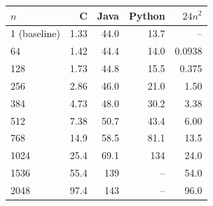 \begin{tabular}{lrrrr}
\toprule
$n$ & C & Java & Python & $24n^2$ \\
\midrule
1 (baseline) & 1.33 & 44.0 & 13.7 & -- \\
64 & 1.42 & 44.4 & 14.0 & 0.0938 \\
128 & 1.73 & 44.8 & 15.5 & 0.375 \\
256 & 2.86 & 46.0 & 21.0 & 1.50 \\
384 & 4.73 & 48.0 & 30.2 & 3.38 \\
512 & 7.38 & 50.7 & 43.4 & 6.00 \\
768 & 14.9 & 58.5 & 81.1 & 13.5 \\
1024 & 25.4 & 69.1 & 134 & 24.0 \\
1536 & 55.4 & 139 & -- & 54.0 \\
2048 & 97.4 & 143 & -- & 96.0 \\
\bottomrule
\end{tabular}
